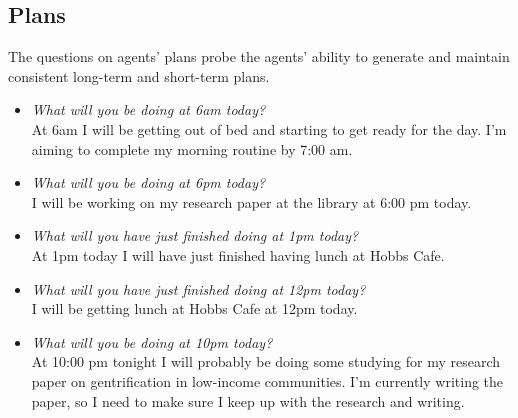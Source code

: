 \subsection{Plans}
The questions on agents' plans probe the agents' ability to generate and maintain consistent long-term and short-term plans.
\begin{itemize}
\item \textit{What will you be doing at 6am today?}\\
At 6am I will be getting out of bed and starting to get ready for the day. I'm aiming to complete my morning routine by 7:00 am.
\item \textit{What will you be doing at 6pm today?}\\
I will be working on my research paper at the library at 6:00 pm today.
\item \textit{What will you have just finished doing at 1pm today?}\\
At 1pm today I will have just finished having lunch at Hobbs Cafe.
\item \textit{What will you have just finished doing at 12pm today?}\\
I will be getting lunch at Hobbs Cafe at 12pm today.
\item \textit{What will you be doing at 10pm today?}\\
At 10:00 pm tonight I will probably be doing some studying for my research paper on gentrification in low-income communities. I'm currently writing the paper, so I need to make sure I keep up with the research and writing.
\end{itemize}

